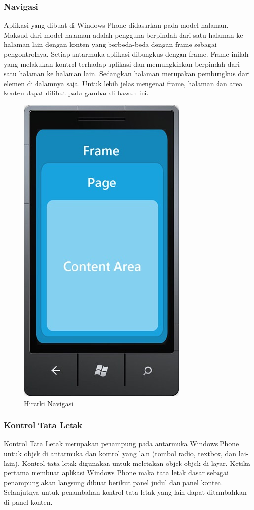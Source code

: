 \subsubsection{Navigasi}
\label{subsubsec:Navigasi}
\hspace{0.5cm} Aplikasi yang dibuat di Windows Phone didasarkan pada model halaman. Maksud dari model halaman adalah pengguna berpindah dari satu halaman ke halaman lain dengan konten yang berbeda-beda dengan frame sebagai pengontrolnya. Setiap antarmuka aplikasi dibungkus dengan frame. Frame inilah yang melakukan kontrol terhadap aplikasi dan memungkinkan berpindah dari satu halaman ke halaman lain. Sedangkan halaman merupakan pembungkus dari elemen di dalamnya saja. Untuk lebih jelas mengenai frame, halaman dan area konten dapat dilihat pada gambar di bawah ini.

\begin{figure}[h]
	\centering
		\includegraphics[scale=0.5]{Gambar/nav_hierarchy.jpg}
	\caption{Hirarki Navigasi}
	\label{fig:nav_hierarchy}
\end{figure}


\subsubsection{Kontrol Tata Letak}
\label{subsubsec:Kontrol Tata Letak}
\hspace{0.5cm} Kontrol Tata Letak merupakan penampung pada antarmuka Windows Phone untuk objek di antarmuka dan kontrol yang lain (tombol radio, textbox, dan lai-lain). Kontrol tata letak digunakan untuk meletakan objek-objek di layar. Ketika pertama membuat aplikasi Windows Phone maka tata letak dasar sebagai penampung akan langsung dibuat berikut panel judul dan panel konten. Selanjutnya untuk penambahan kontrol tata letak yang lain dapat ditambahkan di panel konten.


